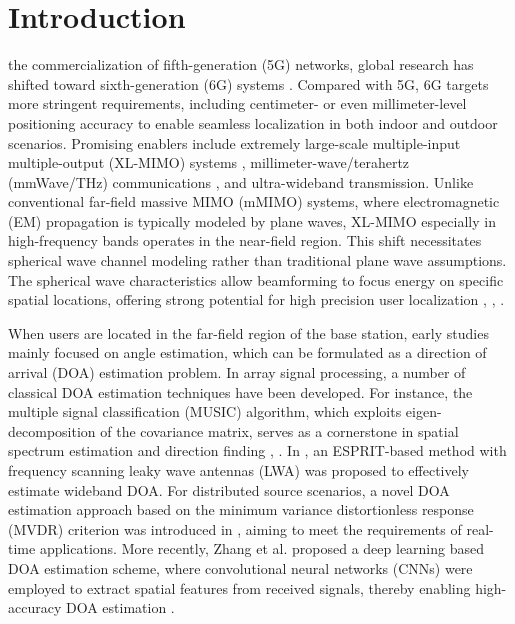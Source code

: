 \documentclass[lettersize,journal]{IEEEtran}
\begin{document}
\section{Introduction}
 the commercialization of fifth-generation (5G) networks, global research has shifted toward sixth-generation (6G) systems \cite{9719949}. Compared with 5G, 6G targets more stringent requirements, including centimeter- or even millimeter-level positioning accuracy to enable seamless localization in both indoor and outdoor scenarios. Promising enablers include extremely large-scale multiple-input multiple-output (XL-MIMO) systems \cite{cui2022near1}, millimeter-wave/terahertz (mmWave/THz) communications \cite{rappaport2013millimeter}, and ultra-wideband transmission. Unlike conventional far-field massive MIMO (mMIMO) systems, where electromagnetic (EM) propagation is typically modeled by plane waves, XL-MIMO especially in high-frequency bands operates in the near-field region. This shift necessitates spherical wave channel modeling rather than traditional plane wave assumptions. The spherical wave characteristics allow beamforming to focus energy on specific spatial locations, offering strong potential for high precision user localization \cite{10750315}, \cite{10843386}, \cite{abu2021near}.

When users are located in the far-field region of the base station, early studies mainly focused on angle estimation, which can be formulated as a direction of arrival (DOA) estimation problem. In array signal processing, a number of classical DOA estimation techniques have been developed. For instance, the multiple signal classification (MUSIC) algorithm, which exploits eigen-decomposition of the covariance matrix, serves as a cornerstone in spatial spectrum estimation and direction finding \cite{schmidt1986multiple}, \cite{lin2006fsf}. In \cite{9068230}, an ESPRIT-based method with frequency scanning leaky wave antennas (LWA) was proposed to effectively estimate wideband DOA. For distributed source scenarios, a novel DOA estimation approach based on the minimum variance distortionless response (MVDR) criterion was introduced in \cite{10005294}, aiming to meet the requirements of real-time applications. More recently, Zhang et al. proposed a deep learning based DOA estimation scheme, where convolutional neural networks (CNNs) were employed to extract spatial features from received signals, thereby enabling high-accuracy DOA estimation \cite{10891008}.
\end{document}
